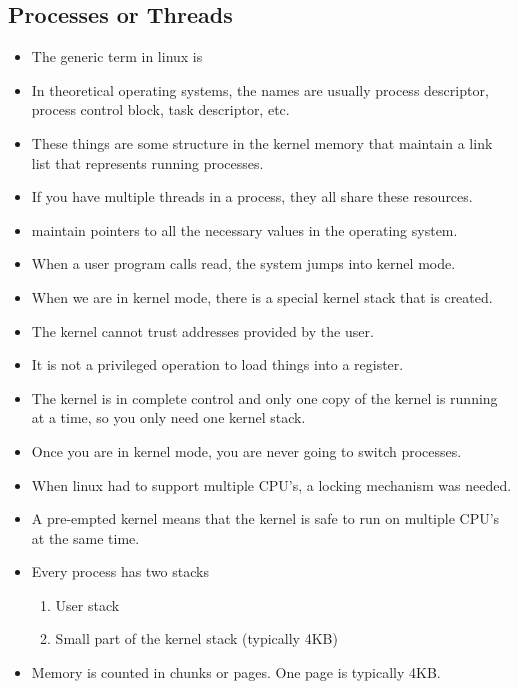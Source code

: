 \documentclass[]{article}
\begin{document}
\subsection{Processes or Threads}
\begin{itemize}
\item The generic term in linux is 
\item In theoretical operating systems, the names are usually process
descriptor, process control block, task descriptor, etc.
\item These things are some structure in the kernel memory that maintain a link
list that represents running processes.
\item If you have multiple threads in a process, they all share these resources.
\item {} maintain pointers to all the necessary values in the
operating system.
\item When a user program calls read, the system jumps into kernel mode.
\item When we are in kernel mode, there is a special kernel stack that is
created.
\item The kernel cannot trust addresses provided by the user.
\item It is not a privileged operation to load things into a register.
\item The kernel is in complete control and only one copy of the kernel is
running at a time, so you only need one kernel stack.
\item Once you are in kernel mode, you are never going to switch processes.
\item When linux had to support multiple CPU's, a locking mechanism was needed.
\item A pre-empted kernel means that the kernel is safe to run on multiple CPU's
at the same time.
\item Every process has two stacks
\begin{enumerate}
\item User stack
\item Small part of the kernel stack (typically 4KB)
\end{enumerate}
\item Memory is counted in chunks or pages. One page is typically 4KB.
\end{itemize}
\end{document}
